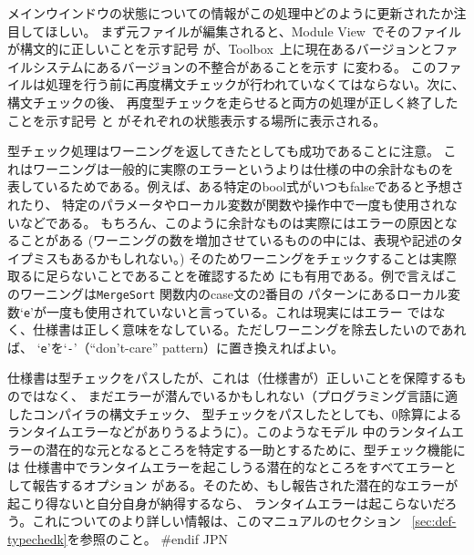 \documentclass[\pformat,12pt]{article}
\newcommand{\Toolbox}{Toolbox}
\newcommand{\vdmModView}{\guicmd{Module View}}
\newcommand{\vdmModView}{\guicmd{モジュールビュー}}
\newcommand{\Toolbox}{Toolbox}
\newcommand{\vdmModView}{\guicmd{VDM View}}
\newcommand{\vdmModView}{\guicmd{VDMビュー}}
\newcommand{\guicmd}[1]{{\sf #1}}
\newcommand{\guicmd}[1]{{\gt #1}}
\begin{document}
メインウインドウの状態についての情報がこの処理中どのように更新されたか注目してほしい。
まず元ファイルが編集されると、\vdmModView\ でそのファイルが構文的に正しいことを示す記号
が、\Toolbox\ 上に現在あるバージョンとファイルシステムにあるバージョンの不整合があることを示す
に変わる。
このファイルは処理を行う前に再度構文チェックが行われていなくてはならない。次に、構文チェックの後、
再度型チェックを走らせると両方の処理が正しく終了したことを示す記号
と
がそれぞれの状態表示する場所に表示される。

型チェック処理はワーニングを返してきたとしても成功であることに注意。
これはワーニングは一般的に実際のエラーというよりは仕様の中の余計なものを
表しているためである。例えば、ある特定のbool式がいつもfalseであると予想されたり、
特定のパラメータやローカル変数が関数や操作中で一度も使用されないなどである。
もちろん、このように余計なものは実際にはエラーの原因となることがある
(ワーニングの数を増加させているものの中には、表現や記述のタイプミスもあるかもしれない。)
そのためワーニングをチェックすることは実際取るに足らないことであることを確認するため
にも有用である。例で言えばこのワーニングは{\tt MergeSort} 関数内のcase文の2番目の
パターンにあるローカル変数`{\tt e}'が一度も使用されていないと言っている。これは現実にはエラー
ではなく、仕様書は正しく意味をなしている。ただしワーニングを除去したいのであれば、
`{\tt e}'を`{\tt -}'（“don't-care” pattern）に置き換えればよい。

仕様書は型チェックをパスしたが、これは（仕様書が）正しいことを保障するものではなく、
まだエラーが潜んでいるかもしれない（プログラミング言語に適したコンパイラの構文チェック、
型チェックをパスしたとしても、0除算によるランタイムエラーなどがありうるように）。このようなモデル
中のランタイムエラーの潜在的な元となるところを特定する一助とするために、型チェック機能には
仕様書中でランタイムエラーを起こしうる潜在的なところをすべてエラーとして報告するオプション
がある。そのため、もし報告された潜在的なエラーが起こり得ないと自分自身が納得するなら、
ランタイムエラーは起こらないだろう。これについてのより詳しい情報は、このマニュアルのセクション
~\ref{sec:def-typechedk}を参照のこと。
#endif JPN


% 
%
\end{document}

